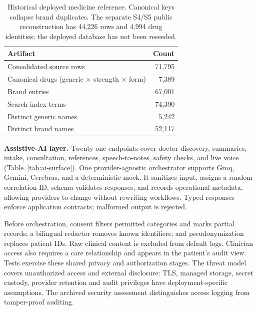 \documentclass[preprint,12pt,a4paper]{elsarticle}
\begin{document}
\begin{table}[!htbp]
\caption{Historical deployed medicine reference. Canonical keys collapse brand duplicates. The separate S4/S5 public reconstruction has 44,226 rows and 4,994 drug identities; the deployed database has not been reseeded.}
\label{tab:corpus}
\centering
\small

\renewcommand{\arraystretch}{1.15}
\setlength{\tabcolsep}{6pt}

\begin{tabular}{@{}lr@{}}

\toprule
\textbf{Artifact} & \textbf{Count} \\
\midrule

Consolidated source rows
& 71{,}795 \\
\midrule

Canonical drugs (generic $\times$ strength $\times$ form)
& 7{,}389 \\
\midrule

Brand entries
& 67{,}001 \\
\midrule

Search-index terms
& 74{,}390 \\
\midrule

Distinct generic names
& 5{,}242 \\
\midrule

Distinct brand names
& 52{,}117 \\

\bottomrule

\end{tabular}

\end{table}

\textbf{Assistive-AI layer.} Twenty-one endpoints cover doctor discovery, summaries, intake,
consultation, references, speech-to-notes, safety checks, and live voice
(Table~\ref{tab:ai-surface}). One provider-agnostic orchestrator supports Groq, Gemini,
Cerebras, and a deterministic mock. It sanitizes input, assigns a random correlation ID,
schema-validates responses, and records operational metadata, allowing providers to change
without rewriting workflows. Typed responses enforce application contracts; malformed output is rejected.

Before orchestration, consent filters permitted categories and marks partial records; a
bilingual redactor removes known identifiers; and pseudonymization replaces patient IDs.
Raw clinical content is excluded from default logs. Clinician access also requires a care
relationship and appears in the patient's audit view. Tests exercise these shared privacy and authorization stages.
The threat model covers unauthorized access and external disclosure: TLS, managed storage,
secret custody, provider retention and audit privileges have deployment-specific assumptions.
The archived security assessment distinguishes access logging from tamper-proof auditing.
\end{document}
